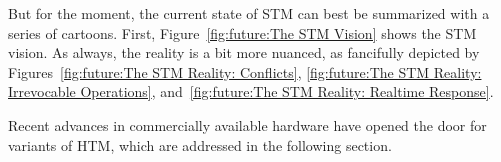 But for the moment, the current state of STM
can best be summarized with a series of cartoons.
First,
Figure~\ref{fig:future:The STM Vision}
shows the STM vision.
As always, the reality is a bit more nuanced, as fancifully depicted by
Figures~\ref{fig:future:The STM Reality: Conflicts},
\ref{fig:future:The STM Reality: Irrevocable Operations},
and~\ref{fig:future:The STM Reality: Realtime Response}.

Recent advances in commercially available hardware have opened the door
for variants of HTM, which are addressed in the following section.

